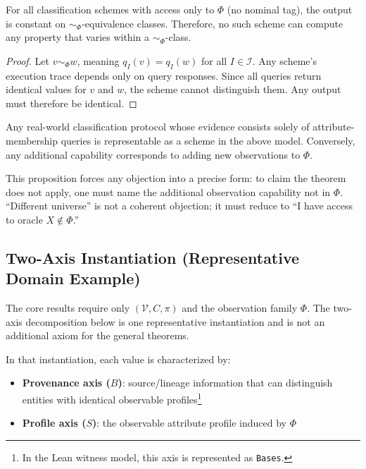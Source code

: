 \begin{theorem}\label{thm:info-barrier}
For all classification schemes with access only to $\Phi$ (no nominal tag), the output is constant on $\sim_\Phi$-equivalence classes. Therefore, no such scheme can compute any property that varies within a $\sim_\Phi$-class.
\end{theorem}

\begin{proof}
Let $v \sim_\Phi w$, meaning $q_I(v) = q_I(w)$ for all $I \in \mathcal{I}$. Any scheme's execution trace depends only on query responses. Since all queries return identical values for $v$ and $w$, the scheme cannot distinguish them. Any output must therefore be identical.
\end{proof}

\begin{proposition}\label{prop:model-capture}
Any real-world classification protocol whose evidence consists solely of attribute-membership queries is representable as a scheme in the above model. Conversely, any additional capability corresponds to adding new observations to $\Phi$.
\end{proposition}

This proposition forces any objection into a precise form: to claim the theorem does not apply, one must name the additional observation capability not in $\Phi$. ``Different universe'' is not a coherent objection; it must reduce to ``I have access to oracle $X \notin \Phi$.''

\subsection{Two-Axis Instantiation (Representative Domain Example)}

The core results require only $(\mathcal{V}, C, \pi)$ and the observation family $\Phi$. The two-axis decomposition below is one representative instantiation and is not an additional axiom for the general theorems.

In that instantiation, each value is characterized by:
\begin{itemize}
\item \textbf{Provenance axis ($B$)}: source/lineage information that can distinguish entities with identical observable profiles\footnote{In the Lean witness model, this axis is represented as \texttt{Bases}.}
\item \textbf{Profile axis ($S$)}: the observable attribute profile induced by $\Phi$
\end{itemize}

